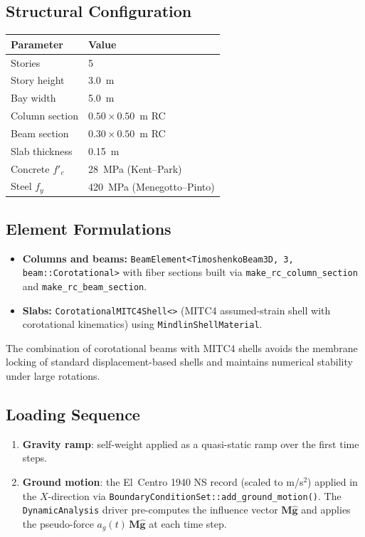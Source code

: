 \subsection{Structural Configuration}

\begin{center}
\begin{tabular}{ll}
  \toprule
  Parameter & Value \\
  \midrule
  Stories & 5 \\
  Story height & 3.0~m \\
  Bay width & 5.0~m \\
  Column section & $0.50 \times 0.50$~m RC \\
  Beam section & $0.30 \times 0.50$~m RC \\
  Slab thickness & 0.15~m \\
  Concrete $f'_c$ & 28~MPa (Kent--Park) \\
  Steel $f_y$ & 420~MPa (Menegotto--Pinto) \\
  \bottomrule
\end{tabular}
\end{center}

\subsection{Element Formulations}

\begin{itemize}
  \item \textbf{Columns and beams:}
    \texttt{BeamElement<TimoshenkoBeam3D, 3, beam::Corotational>}
    with fiber sections built via \texttt{make\_rc\_column\_section}
    and \texttt{make\_rc\_beam\_section}.
  \item \textbf{Slabs:}
    \texttt{CorotationalMITC4Shell<>} (MITC4 assumed-strain shell
    with corotational kinematics) using
    \texttt{MindlinShellMaterial}.
\end{itemize}

The combination of corotational beams with MITC4 shells avoids
the membrane locking of standard displacement-based shells and
maintains numerical stability under large rotations.

\subsection{Loading Sequence}

\begin{enumerate}
  \item \textbf{Gravity ramp}: self-weight applied as a quasi-static
    ramp over the first time steps.
  \item \textbf{Ground motion}: the El~Centro 1940 NS record
    (scaled to m/s$^2$) applied in the $X$-direction via
    \texttt{BoundaryConditionSet::add\_ground\_motion()}.
    The \texttt{DynamicAnalysis} driver pre-computes the
    influence vector $\mathbf{M}\hat{\mathbf{g}}$ and applies
    the pseudo-force $a_g(t)\,\mathbf{M}\hat{\mathbf{g}}$
    at each time step.
\end{enumerate}

